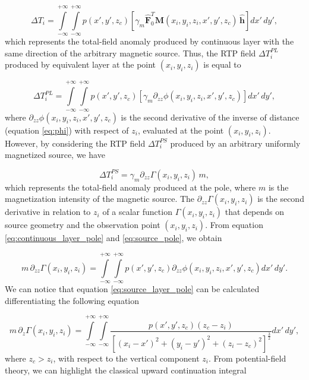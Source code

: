 \begin{equation}
\Delta T_i = \int \limits_{-\infty}^{+\infty } \int \limits_{-\infty}^{+\infty }  p(x',y',z_c)  [\gamma_m \hat{\mathbf{F}}_0^T \mathbf{M}(x_i,y_i,z_i,x',y',z_c) \,\hat{\mathbf{h}}] dx' \,dy',
\label{eq:continuous_layer_source}
\end{equation} 
which represents the total-field anomaly produced by continuous layer with the same direction of the arbitrary magnetic source. Thus, the RTP field $\Delta T_{i}^{PL}$ produced by equivalent layer at the point $(x_i,y_i,z_i)$ is equal to 

\begin{equation}
\Delta T_{i}^{PL} = \int \limits_{-\infty}^{+\infty } \int \limits_{-\infty}^{+\infty }  p(x',y',z_c)  [\gamma_m \partial_{zz} \phi(x_i,y_i,z_i,x',y',z_c) ] dx' \,dy',
\label{eq:continuous_layer_pole}
\end{equation}
where $\partial_{zz} \phi(x_i,y_i,z_i,x',y',z_c)$ is the second derivative of the inverse of distance (equation \ref{eq:phi}) with respect of $z_i$, evaluated at the point $(x_i,y_i,z_i)$. However, by considering the RTP field $\Delta T_{i}^{PS}$ produced by an arbitrary uniformly magnetized source, we have

\begin{equation}
\Delta T_{i}^{PS} = \gamma_m \partial_{zz} \Gamma(x_i,y_i,z_i) \, m,
\label{eq:source_pole}
\end{equation}
which represents the total-field anomaly produced at the pole, where $m$ is the magnetization intensity of the magnetic source. The $\partial_{zz} \Gamma(x_i,y_i,z_i)$ is the second derivative in relation to $z_i$ of a scalar function $\Gamma(x_i,y_i,z_i)$ that depends on source geometry and the observation point $(x_i,y_i,z_i)$. From equation \ref{eq:continuous_layer_pole} and \ref{eq:source_pole}, we obtain 
 
\begin{equation}
m \, \partial_{zz} \Gamma(x_i,y_i,z_i) = \int \limits_{-\infty}^{+\infty } \int \limits_{-\infty}^{+\infty }  p(x',y',z_c)  \partial_{zz} \phi(x_i,y_i,z_i,x',y',z_c)  dx' \,dy'.
\label{eq:source_layer_pole}
\end{equation}
We can notice that equation \ref{eq:source_layer_pole} can be calculated differentiating the following equation

\begin{equation}
m \, \partial_{z} \Gamma(x_i,y_i,z_i) = \int \limits_{-\infty}^{+\infty } \int \limits_{-\infty}^{+\infty }  \dfrac{p(x',y',z_c) (z_c - z_i)}{[(x_i-x')^2 + (y_i-y')^2 + (z_i-z_c)^2]^{\frac{3}{2}}}    dx' \,dy',
\label{eq:mag_upward}
\end{equation}
where $z_c > z_i$, with respect to the vertical component $z_i$. From potential-field theory, we can highlight the classical upward continuation integral 

